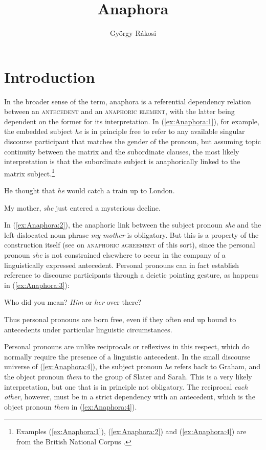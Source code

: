 \documentclass[output=paper,hidelinks]{langscibook}
\title{Anaphora}
\author{György Rákosi\affiliation{University of Debrecen}}
\begin{document}
\maketitle
\label{chap:Anaphora}


\section{Introduction}
\label{sec:Anaphora:1}

In the broader sense of the term, anaphora is a referential dependency relation between an \textsc{antecedent} and an \textsc{anaphoric element}, with the latter being dependent on the former for its interpretation. In (\ref{ex:Anaphora:1}), for example, the embedded subject \emph{he} is in principle free to refer to any available singular discourse participant that matches the gender of the pronoun, but assuming topic continuity between the matrix and the subordinate clauses, the most likely interpretation is that the subordinate subject is anaphorically linked to the matrix subject.\footnote{Examples (\ref{ex:Anaphora:1}), (\ref{ex:Anaphora:2}) and (\ref{ex:Anaphora:4}) are from the British National Corpus \citep{noauthor_undated-hr}.}

\ea\label{ex:Anaphora:1} He thought that \emph{he} would catch a train up to London.
\z

\ea\label{ex:Anaphora:2} My mother, \emph{she} just entered a mysterious decline.
\z

\noindent In (\ref{ex:Anaphora:2}), the anaphoric link between the subject pronoun \emph{she} and the left-dislocated noun phrase \emph{my mother} is obligatory. But this is a property of the construction itself (see  on \textsc{anaphoric agreement} of this sort), since the personal pronoun \emph{she} is not constrained elsewhere to occur in the company of a linguistically expressed antecedent. Personal pronouns can in fact establish reference to discourse participants through a deictic pointing gesture, as happens in (\ref{ex:Anaphora:3}):

\ea\label{ex:Anaphora:3} Who did you mean? \emph{Him} or \emph{her} over there?
\z

\noindent Thus personal pronouns are born free, even if they often end up bound to antecedents under particular linguistic circumstances.

Personal pronouns are unlike reciprocals or reflexives in this respect, which do normally require the presence of a linguistic antecedent. In the small discourse universe of (\ref{ex:Anaphora:4}), the subject pronoun \emph{he} refers back to Graham, and the object pronoun \emph{them} to the group of Slater and Sarah. This is a very likely interpretation, but one that is in principle not obligatory. The reciprocal \emph{each other}, however, must be in a strict dependency with an antecedent, which is the object pronoun \emph{them} in (\ref{ex:Anaphora:4}).
\end{document}
